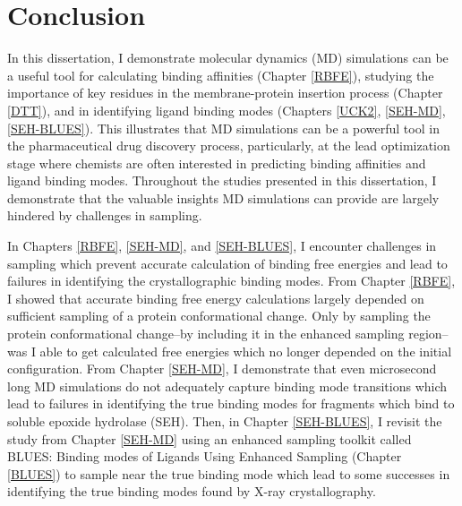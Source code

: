 \chapter*{Conclusion}
In this dissertation, I demonstrate molecular dynamics (MD) simulations can be a useful tool for calculating binding affinities (Chapter \ref{RBFE}), studying the importance of key residues in the membrane-protein insertion process (Chapter \ref{DTT}), and in identifying ligand binding modes (Chapters \ref{UCK2}, \ref{SEH-MD}, \ref{SEH-BLUES}).
This illustrates that MD simulations can be a powerful tool in the pharmaceutical drug discovery process, particularly, at the lead optimization stage where chemists are often interested in predicting binding affinities and ligand binding modes.
Throughout the studies presented in this dissertation, I demonstrate that the valuable insights MD simulations can provide are largely hindered by challenges in sampling.

In Chapters \ref{RBFE}, \ref{SEH-MD}, and \ref{SEH-BLUES}, I encounter challenges in sampling which prevent accurate calculation of binding free energies and lead to failures in identifying the crystallographic binding modes.
From Chapter \ref{RBFE}, I showed that accurate binding free energy calculations largely depended on sufficient sampling of a protein conformational change.
Only by sampling the protein conformational change--by including it in the enhanced sampling region--was I able to get calculated free energies which no longer depended on the initial configuration.
From Chapter \ref{SEH-MD}, I demonstrate that even microsecond long MD simulations do not adequately capture binding mode transitions which lead to failures in identifying the true binding modes for fragments which bind to soluble epoxide hydrolase (SEH).
Then, in Chapter \ref{SEH-BLUES}, I revisit the study from Chapter \ref{SEH-MD} using an enhanced sampling toolkit called BLUES: Binding modes of Ligands Using Enhanced Sampling (Chapter \ref{BLUES}) to sample near the true binding mode which lead to some successes in identifying the true binding modes found by X-ray crystallography.

